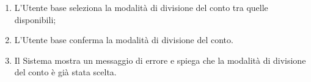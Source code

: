 \begin{itemize}
	      \begin{enumerate}
		      \item L'Utente base seleziona la modalità di divisione del conto
		            tra quelle disponibili;

		      \item L'Utente base conferma la modalità di divisione del conto.

		      \item Il Sistema mostra un messaggio di errore e spiega che la
		            modalità di divisione del conto è già stata scelta.
	      \end{enumerate}
\end{itemize}

